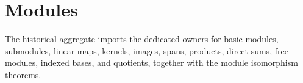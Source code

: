 











\section{Modules}

The historical aggregate imports the dedicated owners for basic modules,
submodules, linear maps, kernels, images, spans, products, direct sums, free
modules, indexed bases, and quotients, together with the module isomorphism
theorems.
